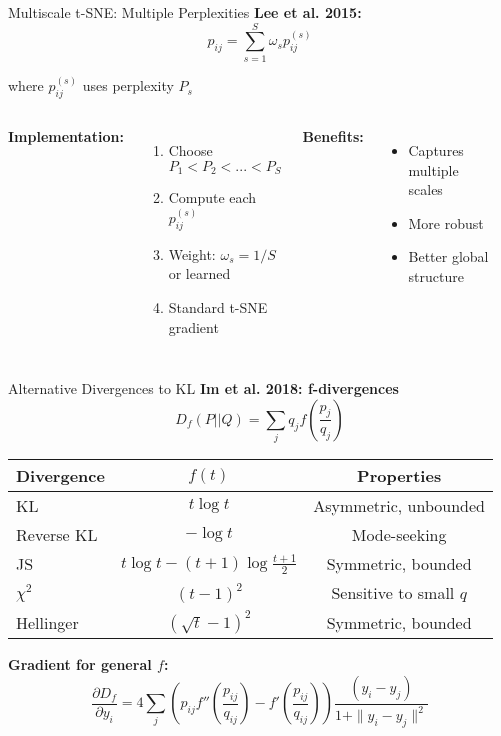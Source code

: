 \begin{frame}{Multiscale t-SNE: Multiple Perplexities}
\textbf{Lee et al. 2015:}
$$p_{ij} = \sum_{s=1}^S \omega_s p_{ij}^{(s)}$$

where $p_{ij}^{(s)}$ uses perplexity $P_s$

\begin{columns}
\textbf{Implementation:}
\begin{enumerate}
\item Choose $P_1 < P_2 < ... < P_S$
\item Compute each $p_{ij}^{(s)}$
\item Weight: $\omega_s = 1/S$ or learned
\item Standard t-SNE gradient
\end{enumerate}

\textbf{Benefits:}
\begin{itemize}
\item Captures multiple scales
\item More robust
\item Better global structure
\end{itemize}

\begin{center}
\end{center}
\end{columns}
\end{frame}

\begin{frame}{Alternative Divergences to KL}
\textbf{Im et al. 2018: f-divergences}
$$D_f(P||Q) = \sum_j q_j f\left(\frac{p_j}{q_j}\right)$$

\begin{center}
\begin{tabular}{l|c|c}
\textbf{Divergence} & \textbf{$f(t)$} & \textbf{Properties} \\
\hline
KL & $t \log t$ & Asymmetric, unbounded \\
Reverse KL & $-\log t$ & Mode-seeking \\
JS & $t\log t - (t+1)\log\frac{t+1}{2}$ & Symmetric, bounded \\
$\chi^2$ & $(t-1)^2$ & Sensitive to small $q$ \\
Hellinger & $(\sqrt{t} - 1)^2$ & Symmetric, bounded \\
\end{tabular}
\end{center}

\textbf{Gradient for general $f$:}
$$\frac{\partial D_f}{\partial y_i} = 4\sum_j \left(p_{ij}f''\left(\frac{p_{ij}}{q_{ij}}\right) - f'\left(\frac{p_{ij}}{q_{ij}}\right)\right)\frac{(y_i - y_j)}{1 + \|y_i - y_j\|^2}$$
  
\end{frame}

